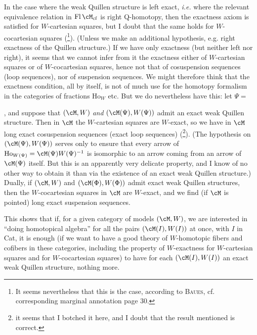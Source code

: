 In the case where the weak Quillen structure is left exact, \textit{i.e.} where the relevant equivalence relation in $\mathrm{Fl}\,\cM_{\mathrm{cf}}$ is right Q-homotopy, then the exactness axiom is satisfied for $W$-cartesian squares, but I doubt that the same holds for $W$-cocartesian squares (\footnote{It seems nevertheless that this is the case, according to \textsc{Baues}, cf. corresponding marginal annotation page 30.}). (Unless we make an additional hypothesis, e.g. right exactness of the Quillen structure.) If we have only exactness (but neither left nor right), it seems that we cannot infer from it the exactness either of $W$-cartesian squares or of $W$-cocartesian squares, hence not that of cosuspension sequences (loop sequences), nor of suspension sequences. We might therefore think that the exactness condition, all by itself, is not of much
use for the homotopy formalism in the categories of fractions $\mathrm{Ho}_W$ etc. But we do nevertheless have this: let $\Psi = {}$, and suppose that $(\cM,W)$ \textit{and} $(\cM(\Psi),W(\Psi))$ 
 admit an exact weak Quillen structure. Then in $\cM$ the $W$-cartesian squares are $W$-exact, so we have in $\cM$ long exact cosuspension sequences (exact loop sequences) (\footnote{it seems that I botched it here, and I doubt that the result mentioned is correct.}). (The hypothesis on $(\cM(\Psi),W(\Psi))$ serves only to ensure that every arrow of $\mathrm{Ho}_{W(\Psi)} = \cM(\Psi)W(\Psi)^{-1}$ is isomorphic to an arrow coming from an arrow of $\cM(\Psi)$ itself. But this is an apparently very delicate property, and I know of no other way to obtain it than via the existence of an exact weak Quillen structure.) Dually, if $(\cM,W)$ and $(\cM(\Phi),W(\Phi))$ admit exact weak Quillen structures, then the $W$-cocartesian squares in $\cM$ are $W$-exact, and we find (if $\cM$ is pointed) long exact suspension sequences. %

This shows that if, for a given category of models $(\cM,W)$, we are interested in ``doing homotopical algebra'' for all the pairs $(\cM(I),W(I))$ at once, with $I$ in Cat, it is enough (if we want to have a good theory of $W$-homotopic fibers and cofibers in these categories, including the property of $W$-exactness for $W$-cartesian squares and for $W$-cocartesian squares) to have for each $(\cM(I),W(I))$ an exact weak Quillen structure, nothing more.

